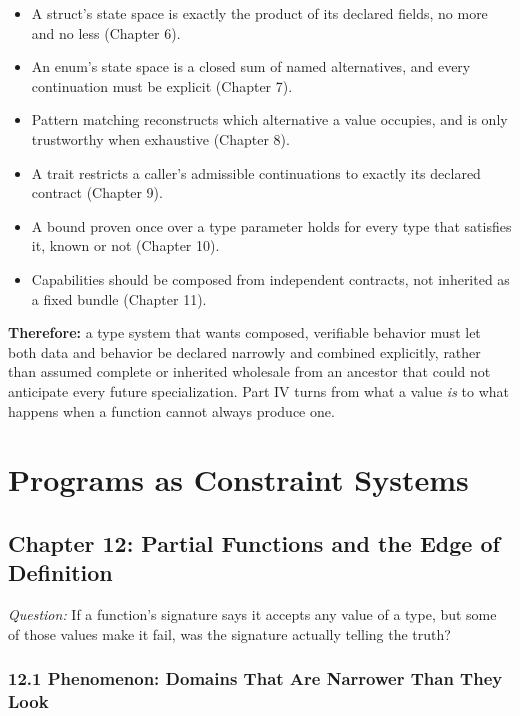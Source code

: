 \documentclass[11pt]{book}
\begin{document}
\begin{itemize}
\item A struct's state space is exactly the product of its declared fields, no more and no less (Chapter 6).
\item An enum's state space is a closed sum of named alternatives, and every continuation must be explicit (Chapter 7).
\item Pattern matching reconstructs which alternative a value occupies, and is only trustworthy when exhaustive (Chapter 8).
\item A trait restricts a caller's admissible continuations to exactly its declared contract (Chapter 9).
\item A bound proven once over a type parameter holds for every type that satisfies it, known or not (Chapter 10).
\item Capabilities should be composed from independent contracts, not inherited as a fixed bundle (Chapter 11).
\end{itemize}

\noindent\textbf{Therefore:} a type system that wants composed, verifiable behavior must let both data and behavior be declared narrowly and combined explicitly, rather than assumed complete or inherited wholesale from an ancestor that could not anticipate every future specialization. Part IV turns from what a value \emph{is} to what happens when a function cannot always produce one.



\clearpage

\part{Programs as Constraint Systems}


\clearpage

\chapter*{Chapter 12: Partial Functions and the Edge of Definition}

\begin{firstprinciples}
\textit{Question:} If a function's signature says it accepts any value of a type, but some of those values make it fail, was the signature actually telling the truth?
\end{firstprinciples}

\section*{12.1 Phenomenon: Domains That Are Narrower Than They Look}
\end{document}
